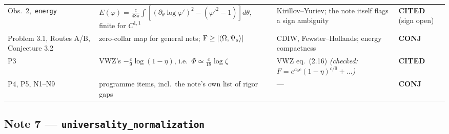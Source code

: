 \documentclass[11pt]{article}
\newcommand{\stCIT}{{\color{navy}\textsf{\scriptsize\bfseries CITED}}}
\newcommand{\stCON}{{\color{warn}\textsf{\scriptsize\bfseries CONJ}}}
\newcommand{\zz}{\zeta}
\begin{document}
{\begin{tabularx}{\textwidth}{L{0.155\textwidth} X L{0.210\textwidth} L{0.098\textwidth}}
Obs.~2,\ \texttt{energy} & $E(\varphi)=\frac c{48\pi}\int[(\partial_\theta\log\varphi')^2-(\varphi'^2-1)]d\theta$, finite for $C^{1,1}$ & Kirillov--Yuriev; the note itself flags a sign ambiguity & \stCIT{} (sign open) \\
Problem 3.1, Routes A/B, Conjecture 3.2 & zero-collar map for general nets; $\operatorname{F}\ge|\langle\Omega,\Psi_s\rangle|$ & CDIW, Fewster--Hollands; energy compactness & \stCON \\
P3 & VWZ's $-\frac c9\log(1-\eta)$, i.e.\ $\Phi\simeq\frac c{18}\log\zz$ & VWZ eq.~(2.16) \emph{(checked: $F=e^{a_0c}(1-\eta)^{c/9}+\dots$)} & \stCIT \\
P4, P5, N1--N9 & programme items, incl.\ the note's own list of rigor gaps & --- & \stCON \\
\bottomrule
\end{tabularx}}

\subsection{Note 7 --- \texttt{universality\_normalization}}
\end{document}
